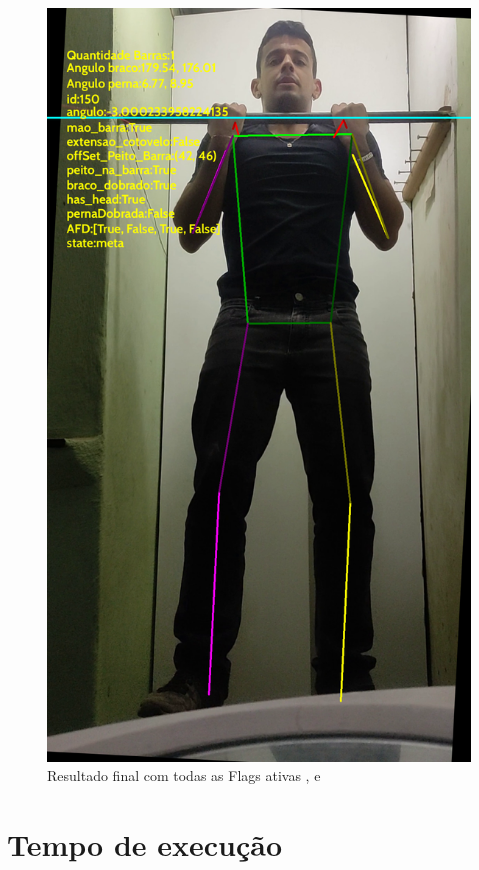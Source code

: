 \begin{figure}[H]
	\centering
	\caption{Resultado final com todas as Flags ativas ,  e }
	\includegraphics[scale=0.2]{figuras/flags.png}
\end{figure}



\section[Tempo de execução]{Tempo de execução}

